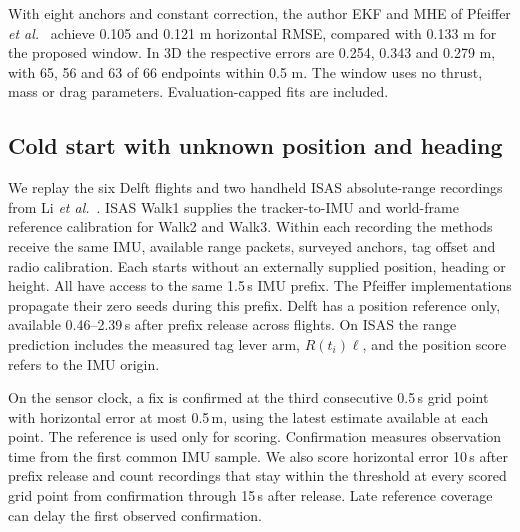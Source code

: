 \documentclass{IEEEtaes}
\begin{document}
With eight anchors and constant correction, the author EKF and MHE of Pfeiffer \emph{et al.}~\cite{pfeiffer} achieve 0.105 and 0.121 m horizontal RMSE, compared with 0.133 m for the proposed window. In 3D the respective errors are 0.254, 0.343 and 0.279 m, with 65, 56 and 63 of 66 endpoints within 0.5 m. The window uses no thrust, mass or drag parameters. Evaluation-capped fits are included.

\subsection{Cold start with unknown position and heading}\label{sec:cold}
We replay the six Delft flights and two handheld ISAS absolute-range recordings from Li \emph{et al.}~\cite{sfuise}. ISAS Walk1 supplies the tracker-to-IMU and world-frame reference calibration for Walk2 and Walk3. Within each recording the methods receive the same IMU, available range packets, surveyed anchors, tag offset and radio calibration. Each starts without an externally supplied position, heading or height. All have access to the same 1.5\,s IMU prefix. The Pfeiffer implementations propagate their zero seeds during this prefix. Delft has a position reference only, available 0.46--2.39\,s after prefix release across flights. On ISAS the range prediction includes the measured tag lever arm, $R(t_i)\ell$, and the position score refers to the IMU origin.

On the sensor clock, a fix is confirmed at the third consecutive 0.5\,s grid point with horizontal error at most 0.5\,m, using the latest estimate available at each point. The reference is used only for scoring. Confirmation measures observation time from the first common IMU sample. We also score horizontal error 10\,s after prefix release and count recordings that stay within the threshold at every scored grid point from confirmation through 15\,s after release. Late reference coverage can delay the first observed confirmation.
\end{document}
